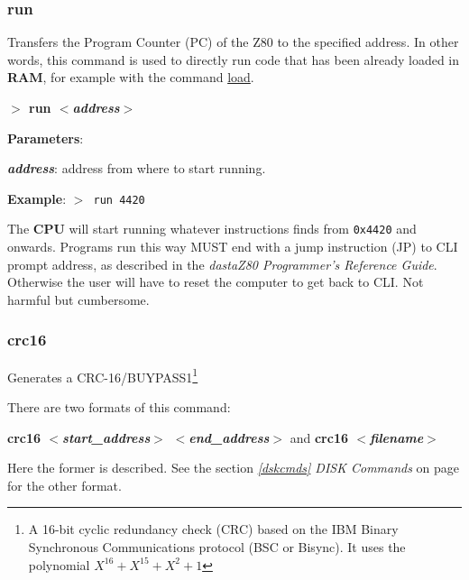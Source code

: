         \subsubsection{{run}}
        \label{cmd:run}

        Transfers the Program Counter (PC) of the Z80 to the specified address.
        In other words, this command is used to directly run code that has been
        already loaded in \textbf{RAM}, for example with the command 
        \hyperref[cmd:load]{load}.

        \hspace{1.9cm}\textbf{$>$ run \textit{$<$address$>$}}

        \textbf{Parameters}:

        \hspace{1cm}\textbf{\textit{address}}: address from where to start
        running.
        
        \textbf{Example}: \texttt{$>$ run 4420}

        The \textbf{CPU} will start running whatever instructions finds from
        \texttt{0x4420} and onwards. Programs run this way MUST end with a
        jump instruction (JP) to CLI prompt address, as described in the
        \textit{dastaZ80 Programmer’s Reference Guide}\cite{dastaz80progref}.
        Otherwise the user will have to reset the computer to get back to CLI.
        Not harmful but cumbersome.

        \subsubsection{{crc16}}
        Generates a CRC-16/BUYPASS1\footnote{A 16-bit cyclic redundancy
        check (CRC) based on the IBM Binary Synchronous Communications
        protocol\cite{ibmbsc} (BSC or Bisync). It uses the polynomial
        $X^{16} + X^{15} +X^2 + 1$}

        There are two formats of this command: 
        
        \textbf{crc16 \textit{$<$start\_address$>$ $<$end\_address$>$}}
        and \textbf{crc16 \textit{$<$filename$>$}} 
        
        Here the former is described. See the section \textit{\ref{dskcmds} 
        DISK Commands} on page \pageref{dskcmds} for the other format.

